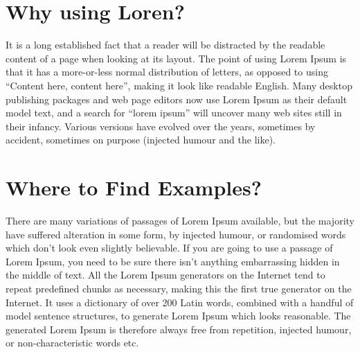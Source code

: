 \section{Why using Loren?}

It is a long established fact that a reader will be distracted by the
readable content of a page when looking at its layout.
The point of using Lorem Ipsum is that it has a more-or-less normal
distribution of letters, as opposed to using ``Content here, content
here'', making it look like readable English.
Many desktop publishing packages and web page editors now use Lorem
Ipsum as their default model text, and a search for ``lorem ipsum''
will uncover many web sites still in their infancy.
Various versions have evolved over the years, sometimes by accident,
sometimes on purpose (injected humour and the like).  

\section{Where to Find Examples?}

There are many variations of passages of Lorem Ipsum available, but
the majority have suffered alteration in some form, by injected
humour, or randomised words which don't look even slightly
believable.
If you are going to use a passage of Lorem Ipsum, you need to be sure
there isn't anything embarrassing hidden in the middle of text.
All the Lorem Ipsum generators on the Internet tend to repeat
predefined chunks as necessary, making this the first true generator 
on the Internet.
It uses a dictionary of over 200 Latin words, combined with a handful
of model sentence structures, to generate Lorem Ipsum which looks
reasonable.
The generated Lorem Ipsum is therefore always free from repetition,
injected humour, or non-characteristic words etc. 
